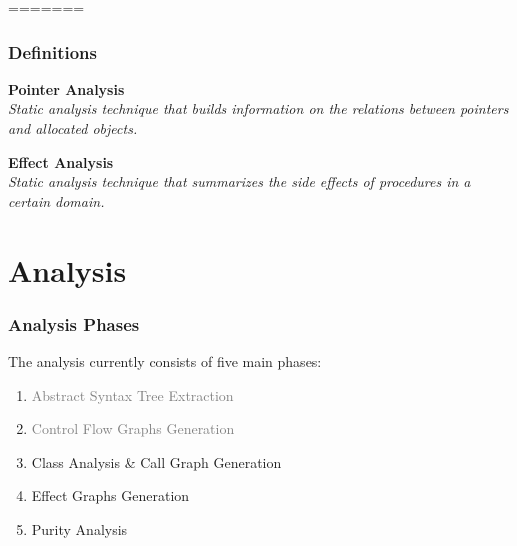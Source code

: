 \documentclass[hyperref={pdfpagelabels=false}]{beamer}
\begin{document}
\begin{frame}[label=overview]
%
%
%
=======
\frametitle{Definitions}
    \textbf{Pointer Analysis}\\
    \emph{Static analysis technique that builds information on the
relations between pointers and allocated objects.}

    \vspace{30pt}

    \textbf{Effect Analysis}\\
    \emph{Static analysis technique that summarizes the side effects
of procedures in a certain domain.}
\end{frame}

\section{Analysis}
\begin{frame}
    \frametitle{Analysis Phases}
    The analysis currently consists of five main phases:
    \begin{enumerate}
        \item \textcolor{gray}{Abstract Syntax Tree Extraction}
        \item \textcolor{gray}{Control Flow Graphs Generation}
        \item Class Analysis \& Call Graph Generation
        \item Effect Graphs Generation
        \item Purity Analysis
    \end{enumerate}
\end{frame}
\end{document}
